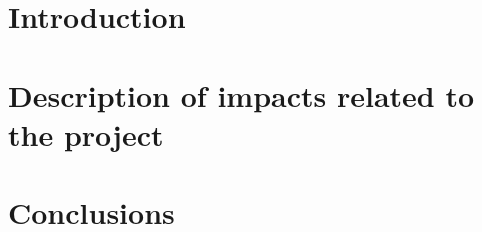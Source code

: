 \documentclass[../main.tex]{subfiles}
\begin{document}
\section{Introduction}

\section{Description of impacts related to the project}

\section{Conclusions}

\end{document}
